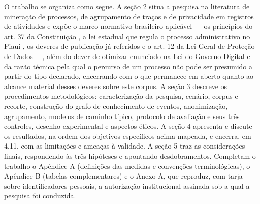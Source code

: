 O trabalho se organiza como segue. A seção 2 situa a pesquisa na literatura de mineração de
processos, de agrupamento de traços e de privacidade em registros de atividades
\cite{vanderaalst2016processmining,song2009trace,esser2021ekg} e expõe o marco normativo
brasileiro aplicável --- os princípios do art. 37 da Constituição \cite{brasil1988cf}, a lei
estadual que regula o processo administrativo no Piauí \cite{state2016procedurelaw}, os deveres
de publicação já referidos e o art. 12 da Lei Geral de Proteção de Dados \cite{brasil2018lgpd}
---, além do dever de otimizar enunciado na Lei do Governo Digital e da razão técnica pela qual o
percurso de um processo não pode ser presumido a partir do tipo declarado, encerrando com o que
permanece em aberto quanto ao alcance material desses deveres sobre este corpus. A seção 3 descreve os procedimentos metodológicos: caracterização da pesquisa,
cenário, corpus e recorte, construção do grafo de conhecimento de eventos, anonimização,
agrupamento, modelos de caminho típico, protocolo de avaliação e seus três controles, desenho
experimental e aspectos éticos. A seção 4 apresenta e discute os resultados, na ordem dos
objetivos específicos acima mapeada, e encerra, em 4.11, com as limitações e ameaças à validade. A seção 5 traz
as considerações finais, respondendo às três hipóteses e apontando desdobramentos. Completam o
trabalho o Apêndice A (definições das medidas e convenções terminológicas), o Apêndice B (tabelas
complementares) e o Anexo A, que reproduz, com tarja sobre identificadores pessoais, a
autorização institucional assinada sob a qual a pesquisa foi conduzida.
